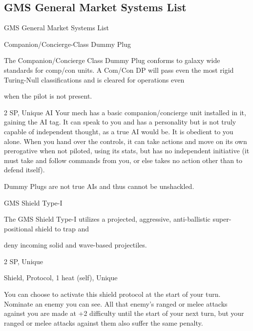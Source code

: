 \subsection{GMS General Market Systems List}
                                GMS General Market Systems List

Companion/Concierge-Class Dummy Plug

The Companion/Concierge Class Dummy Plug conforms to galaxy wide standards for comp/con units. A
Com/Con DP will pass even the most rigid Turing-Null classifications and is cleared for operations even

when the pilot is not present.

2 SP, Unique
AI
Your mech has a basic companion/concierge unit installed in it, gaining the AI tag. It can speak
to you and has a personality but is not truly capable of independent thought, as a true AI would
be. It is obedient to you alone. When you hand over the controls, it can take actions and move
on its own prerogative when not piloted, using its stats, but has no independent initiative (it must
take and follow commands from you, or else takes no action other than to defend itself).


Dummy Plugs are not true AIs and thus cannot be unshackled.


GMS Shield Type-I

The GMS Shield Type-I utilizes a projected, aggressive, anti-ballistic super-positional shield to trap and

deny incoming solid and wave-based projectiles.


2 SP, Unique

Shield, Protocol, 1 heat (self), Unique





You can choose to activate this shield protocol at the start of your turn. Nominate an enemy you
can see. All that enemy’s ranged or melee attacks against you are made at +2 difficulty until the
start of your next turn, but your ranged or melee attacks against them also suffer the same
penalty.